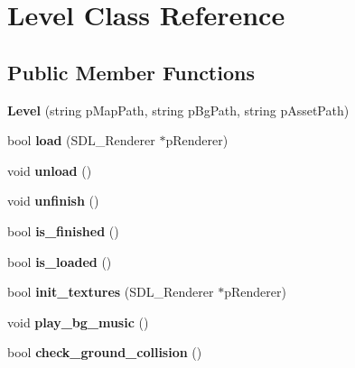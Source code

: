 \hypertarget{classLevel}{}\section{Level Class Reference}
\label{classLevel}
\subsection*{Public Member Functions}
\begin{DoxyCompactItemize}
\item 
\mbox{\label{classLevel_a0ffba725fe31ff293c753e046fb4a6c8}} 
{\bfseries Level} (string p\+Map\+Path, string p\+Bg\+Path, string p\+Asset\+Path)
\item 
\mbox{\label{classLevel_a47e74dd6600b00e7df4b37cf7c2a7b9f}} 
bool {\bfseries load} (S\+D\+L\+\_\+\+Renderer $\ast$p\+Renderer)
\item 
\mbox{\label{classLevel_a42ab65803b47558b16aa087b6d4c8f07}} 
void {\bfseries unload} ()
\item 
\mbox{\label{classLevel_a5734224ad9ca9ee0ad1d951ca5d354d7}} 
void {\bfseries unfinish} ()
\item 
\mbox{\label{classLevel_ad970f169d42835f1e99f62c2ebd7c23a}} 
bool {\bfseries is\+\_\+finished} ()
\item 
\mbox{\label{classLevel_a52319ddc48cc27325c9171254fa41139}} 
bool {\bfseries is\+\_\+loaded} ()
\item 
\mbox{\label{classLevel_af4d1861b3fd10b43f2dcb56baf722369}} 
bool {\bfseries init\+\_\+textures} (S\+D\+L\+\_\+\+Renderer $\ast$p\+Renderer)
\item 
\mbox{\label{classLevel_abde2712bc3f7a51a4fd60eea6fe7cb2b}} 
void {\bfseries play\+\_\+bg\+\_\+music} ()
\item 
\mbox{\label{classLevel_acefc1ddf6b023ce787e69100bf8af99a}} 
bool {\bfseries check\+\_\+ground\+\_\+collision} ()
\item 
\mbox{\label{classLevel_a29be0d8f6887dcc317c253e05f54d48c}} 

\end{DoxyCompactItemize}

